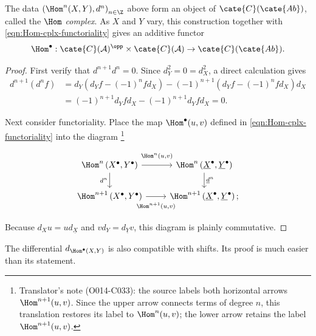 \begin{definition-proposition}
	The data $\left(\Hom^n(X,Y),d^n\right)_{n\in\Z}$ above form an object of
	$\cate{C}(\cate{Ab})$, called the \emph{$\Hom$ complex}. As $X$ and $Y$
	vary, this construction together with
	\eqref{eqn:Hom-cplx-functoriality} gives an additive functor
	\[ \Hom^\bullet: \cate{C}(\mathcal{A})^{\opp} \times \cate{C}(\mathcal{A}) \to \cate{C}(\cate{Ab}). \]
\end{definition-proposition}
\begin{proof}
	First verify that $d^{n+1}d^n=0$. Since $d_Y^2=0=d_X^2$, a direct
	calculation gives
	\begin{align*}
		d^{n+1} \left( d^n f \right) & = d_Y \left( d_Y f - (-1)^n f d_X \right) - (-1)^{n+1} \left( d_Y f - (-1)^n f d_X \right) d_X \\
		& = (-1)^{n+1} d_Y f d_X - (-1)^{n+1} d_Y f d_X = 0.
	\end{align*}

	Next consider functoriality. Place the map $\Hom^\bullet(u,v)$ defined in
	\eqref{eqn:Hom-cplx-functoriality} into the diagram%
	\footnote{Translator's note (O014-C033): the source labels both horizontal
	arrows $\Hom^{n+1}(u,v)$. Since the upper arrow connects terms of degree
	$n$, this translation restores its label to $\Hom^n(u,v)$; the lower arrow
	retains the label $\Hom^{n+1}(u,v)$.}
	\[\begin{tikzcd}
		\Hom^n\left( X^\bullet, Y^\bullet \right) \arrow[d, "{d^n}"'] \arrow[r, "{\Hom^n(u, v)}" inner sep=0.7em] & \Hom^n\left( \underline{X}^\bullet, \underline{Y}^\bullet \right) \arrow[d, "{\underline{d}^n}"] \\
		\Hom^{n+1}\left( X^\bullet, Y^\bullet \right) \arrow[r, "{\Hom^{n+1}(u, v)}"' inner sep=0.7em] & \Hom^{n+1}\left( \underline{X}^\bullet, \underline{Y}^\bullet \right) ;
	\end{tikzcd}\]
	Because $d_Xu=ud_{\underline{X}}$ and $vd_Y=d_{\underline{Y}}v$, this
	diagram is plainly commutative.
\end{proof}

The differential $d_{\Hom^\bullet(X,Y)}$ is also compatible with shifts. Its
proof is much easier than its statement.

